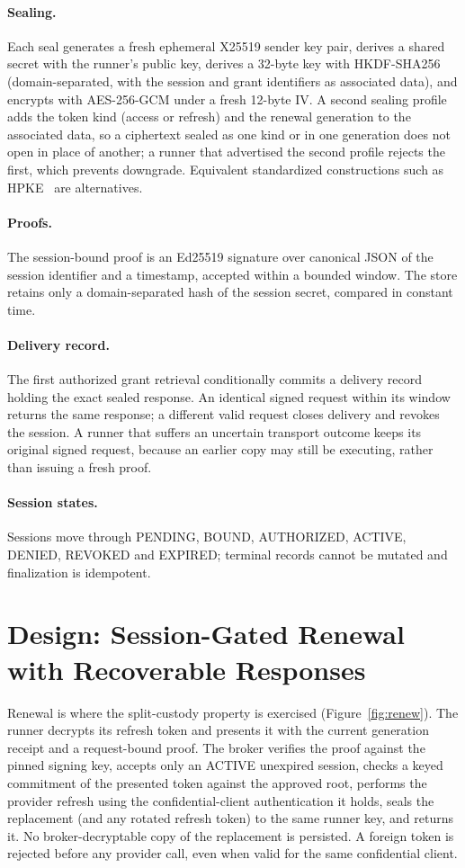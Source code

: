 \documentclass[11pt]{article}
\begin{document}
\paragraph{Sealing.} Each seal generates a fresh ephemeral X25519 sender key pair, derives a shared secret with the runner's public key, derives a 32-byte key with HKDF-SHA256 (domain-separated, with the session and grant identifiers as associated data), and encrypts with AES-256-GCM under a fresh 12-byte IV. A second sealing profile adds the token kind (access or refresh) and the renewal generation to the associated data, so a ciphertext sealed as one kind or in one generation does not open in place of another; a runner that advertised the second profile rejects the first, which prevents downgrade. Equivalent standardized constructions such as HPKE~\cite{rfc9180} are alternatives. \paragraph{Proofs.} The session-bound proof is an Ed25519 signature over canonical JSON of the session identifier and a timestamp, accepted within a bounded window. The store retains only a domain-separated hash of the session secret, compared in constant time.

\paragraph{Delivery record.} The first authorized grant retrieval conditionally commits a delivery record holding the exact sealed response. An identical signed request within its window returns the same response; a different valid request closes delivery and revokes the session. A runner that suffers an uncertain transport outcome keeps its original signed request, because an earlier copy may still be executing, rather than issuing a fresh proof.

\paragraph{Session states.} Sessions move through PENDING, BOUND, AUTHORIZED, ACTIVE, DENIED, REVOKED and EXPIRED; terminal records cannot be mutated and finalization is idempotent.

\section{Design: Session-Gated Renewal with Recoverable Responses}
\label{sec:renewal}
Renewal is where the split-custody property is exercised (Figure~\ref{fig:renew}). The runner decrypts its refresh token and presents it with the current generation receipt and a request-bound proof. The broker verifies the proof against the pinned signing key, accepts only an ACTIVE unexpired session, checks a keyed commitment of the presented token against the approved root, performs the provider refresh using the confidential-client authentication it holds, seals the replacement (and any rotated refresh token) to the same runner key, and returns it. No broker-decryptable copy of the replacement is persisted. A foreign token is rejected before any provider call, even when valid for the same confidential client.
\end{document}
